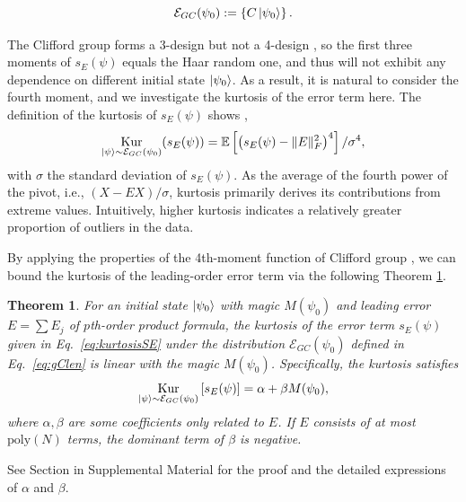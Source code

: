 \documentclass[showpacs,amsmath,amssymb,twocolumn,aps,pra,superscriptaddress,notitlepage,10pt]{revtex4-2}
\newcommand{\bE}{\mathbb E}
\newcommand{\cM}{\mathcal E_{GC}}
\newtheorem{theorem}{Theorem}
\begin{document}
\begin{equation}\label{eq:gClen}
    \cM(\psi_0):=\left\{C\ket{\psi_0}\right\}.
\end{equation}

The Clifford group forms a 3-design but not a 4-design \cite{webb2015clifford,zhu2016clifford,bittel2025completetheorycliffordcommutant}, so the first three moments of $s_E(\psi)$ equals the Haar random one, and thus will not exhibit any dependence on different initial state $\ket{\psi_0}$. As a result, it is natural to consider the fourth moment, and we investigate the kurtosis of the error term here. The definition of the kurtosis of $s_E(\psi)$ shows \cite{westfall2014kurtosis},
\begin{equation}\label{eq:kurtosisSE}
    \mathop{\mathrm{Kur}}_{\ket{\psi}\sim\cM(\psi_0)}(s_E(\psi))=\bE\left[\left(s_E(\psi)-\|E\|_F^2\right)^4\right]/\sigma^4,
\end{equation}
with $\sigma$ the standard deviation of $s_E(\psi)$. As the average of the fourth power of the pivot, i.e., $(X-EX)/\sigma$, kurtosis primarily derives its contributions from extreme values. Intuitively, higher kurtosis indicates a relatively greater proportion of outliers in the data.

By applying the properties of the 4th-moment function of Clifford group \cite{zhu2016clifford,bittel2025completetheorycliffordcommutant,Zhou2023performanceanalysis}, we can bound the kurtosis of the leading-order error term via the following Theorem \ref{theo: kurtosis}.

\begin{theorem}\label{theo: kurtosis}
    For an initial state $\ket{\psi_0}$ with magic $M(\psi_0)$ and leading error $E=\sum E_j$ of $p$th-order product formula, the kurtosis of the error term $s_E(\psi)$ given in Eq.~\eqref{eq:kurtosisSE} under the distribution $\cM(\psi_0)$ defined in Eq.~\eqref{eq:gClen} is linear with the magic $M(\psi_0)$. Specifically, the kurtosis satisfies
    \begin{equation}\label{eq:MnegK}
        \mathop{\mathrm{Kur}}_{\ket{\psi}\sim\cM(\psi_0)}\left[s_E(\psi)\right]=\alpha +\beta M(\psi_0),
    \end{equation}
    where $\alpha,\beta$ are some coefficients only related to $E$. If $E$ consists of at most $\mathrm{poly}(N)$ terms, the dominant term of $\beta$ is negative.
\end{theorem}

See Section \uppercase\expandafter{} in Supplemental Material \cite{seesm} for the proof and the detailed expressions of $\alpha$ and $\beta$.
\end{document}
